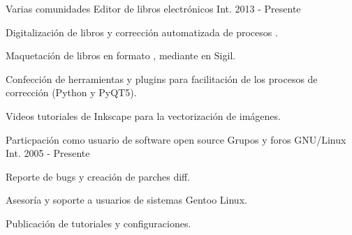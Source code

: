 


\begin{cventries}

  \cventry
    {Varias comunidades} %
    {Editor de libros electrónicos} %
    {Int.} %
    {2013 - Presente} %
    {
      \begin{cvitems} %
        \item {Digitalización de libros y corrección automatizada de procesos .}
        \item {Maquetación de libros en formato ,  mediante  en Sigil.}
        \item {Confección de herramientas y plugins para facilitación de los procesos de corrección (Python y PyQT5).}
        \item {Videos tutoriales de Inkscape para la vectorización de imágenes.}
      \end{cvitems}
    }

  \cventry
    {Particpación como usuario de software open source} %
    {Grupos y foros GNU/Linux} %
    {Int.} %
    {2005 - Presente} %
    {
      \begin{cvitems} %
        \item {Reporte de bugs y creación de parches diff.}
        \item {Asesoría y soporte a usuarios de sistemas Gentoo Linux.}
        \item {Publicación de tutoriales y configuraciones.}
      \end{cvitems}
    }


\end{cventries}
